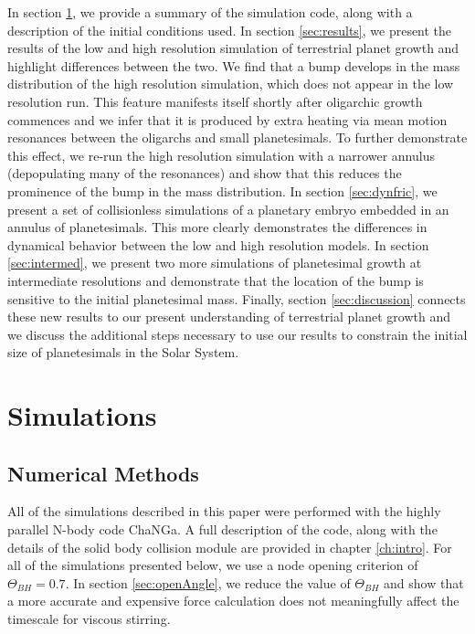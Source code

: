 In section \ref{sec:sim}, we provide a summary of the simulation code, along with a description of the initial conditions used.
In section \ref{sec:results}, we present the results of the low and high resolution 
simulation of terrestrial planet growth and highlight differences between the two. We find that a bump develops in the mass 
distribution of the high resolution simulation, which does not appear in the low resolution run. This feature manifests itself shortly 
after oligarchic growth commences and we infer that it is produced by extra heating via mean motion resonances between the 
oligarchs and small planetesimals. To further demonstrate this effect, we re-run the high resolution simulation with a narrower 
annulus (depopulating many of the resonances) and show that this reduces the prominence of the bump in the mass distribution. 
In section \ref{sec:dynfric}, we present a set of collisionless simulations of a planetary embryo embedded in an annulus of 
planetesimals. This more clearly demonstrates the differences in dynamical behavior between the low and high resolution 
models. In section \ref{sec:intermed}, we present two more simulations of planetesimal growth at intermediate resolutions and 
demonstrate that the location of the bump is sensitive to the initial planetesimal mass. Finally, section \ref{sec:discussion} 
connects these new results to our present understanding of terrestrial planet growth and we discuss the additional steps 
necessary to use our results to constrain the initial size of planetesimals in the Solar System.

\section{Simulations} \label{sec:sim}

\subsection{Numerical Methods} \label{sec:numerical}

All of the simulations described in this paper were performed with the highly parallel N-body code {\sc ChaNGa}. A full description 
of the code, along with the details of the solid body collision module are provided in chapter \ref{ch:intro}. For all of the simulations 
presented below, we use a node opening criterion of $\Theta_{BH} = 0.7$. In section \ref{sec:openAngle}, we reduce the value of 
$\Theta_{BH}$ and show that a more accurate and expensive force calculation does not meaningfully affect the timescale for 
viscous stirring.

